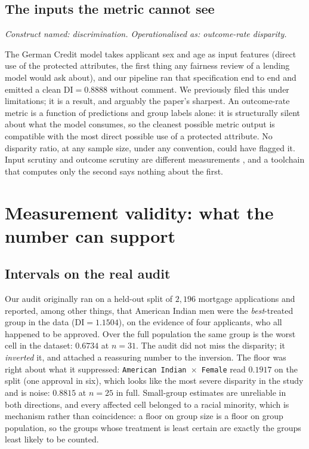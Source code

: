 \documentclass[sigconf,nonacm]{acmart}
\begin{document}
\subsection{The inputs the metric cannot see}
\label{sec:treatment}

\emph{Construct named: discrimination. Operationalised as: outcome-rate
disparity.}

The German Credit model takes applicant sex and age as input features
(direct use of the protected attributes, the first thing any fairness review
of a lending model would ask about), and our pipeline ran that
specification end to end and emitted a clean $\mathrm{DI}=0.8888$ without
comment. We previously filed this under limitations; it is a result, and
arguably the paper's sharpest. An outcome-rate metric is a function of
predictions and group labels alone: it is structurally silent about what the
model consumes, so the cleanest possible metric output is compatible with the
most direct possible use of a protected attribute. No disparity ratio, at any
sample size, under any convention, could have flagged it. Input scrutiny
and outcome scrutiny are different measurements \citep{gillis2022}, and a
toolchain that computes only the second says nothing about the first.

\section{Measurement validity: what the number can support}
\label{sec:validity}

\subsection{Intervals on the real audit}
\label{sec:intervals}

Our audit originally ran on a held-out split of $2{,}196$ mortgage
applications and reported, among other things, that American Indian men were
the \emph{best}-treated group in the data ($\mathrm{DI}=1.1504$), on the
evidence of four applicants, who all happened to be approved. Over the full
population the same group is the worst cell in the dataset: $0.6734$ at
$n{=}31$. The audit did not miss the disparity; it \emph{inverted} it, and
attached a reassuring number to the inversion. The floor was right about what
it suppressed: \texttt{American Indian $\times$ Female} read $0.1917$ on the
split (one approval in six), which looks like the most severe disparity in the
study and is noise: $0.8815$ at $n{=}25$ in full. Small-group estimates are
unreliable in both directions, and every affected cell belonged to a racial
minority, which is mechanism rather than coincidence: a floor on group size is
a floor on group population, so the groups whose treatment is least certain
are exactly the groups least likely to be counted.
\end{document}
